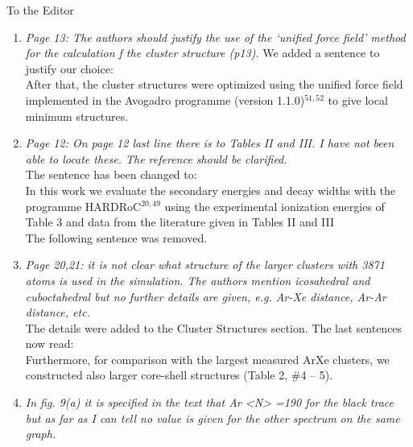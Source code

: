 \documentclass[DIN,pagenumber=false,parskip=half,fromalign=left,fromphone=true,fromemail=true,fromurl=false,fromlogo=false,fromrule=false]{scrlttr2}
\begin{document}
\begin{letter}{To the Editor}
\begin{enumerate}
 \item \emph{Page 13:
       The authors should justify the use of the ‘unified force field’ method for the calculation f the cluster structure (p13).}
       We added a sentence to justify our choice:\\
       After that, the cluster structures were optimized using the unified
       force field implemented in the Avogadro programme
       (version 1.1.0)$^{51,52}$ to give local minimum structures.
       {\color{blue}{ The method
       was chosen due to its low computational cost, the possibility to find
       the next local minimum structure based on the chosen starting point
       and the necessary effort to produce reliable results with density
       functional theory (DFT) for v. d. Waals interactions since we in
       this work discuss structural trends and not absolute structures.}}

 \item \emph{Page 12:
       On page 12 last line there is to Tables II and III. I have not been able to locate these. The reference should be clarified.}\\
       The sentence has been changed to:\\
       In this work we evaluate the secondary energies and decay widths with
       the programme HARDRoC$^{20,49}$ using the experimental ionization energies
       of Table 3 and data from the literature given in Tables II and III
       {\color{blue}{of Ref. 34.}}\\
       The following sentence was removed.

 \item \emph{Page 20,21:
       it is not clear what structure of the larger clusters with 3871 atoms is used in the simulation. The authors mention icosahedral and cuboctahedral but no further details are given, e.g. Ar-Xe distance, Ar-Ar distance, etc.}\\
       The details were added to the Cluster Structures section. The last
       sentences now read:\\
       Furthermore, for comparison with the largest measured ArXe clusters,
       we constructed also larger core-shell structures (Table 2, \#4 – 5).
       {}

 \item \emph{In fig. 9(a) it is specified in the text that  Ar <N> =190 for the black trace but as far as I can tell no value is given for the other spectrum on the same graph.}


\end{enumerate}
\end{letter}
\end{document}
